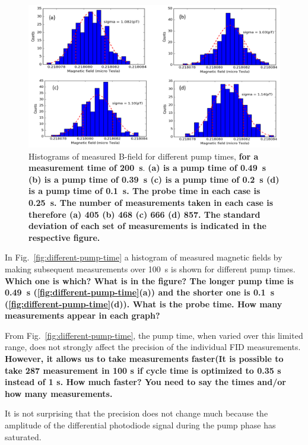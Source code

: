 \begin{figure}%
  \centering\includegraphics[width=\linewidth]{figures/pump_time}
  \caption{Histograms of measured B-field for different pump times,
    {\bf for a measurement time of 200~s}. {\bf (a) is a pump time of
      0.49~s (b) is a pump time of 0.39~s (c) is a pump time of 0.2~s
      (d) is a pump time of 0.1~s.  The probe time in each case is
      0.25~s.  The number of measurements taken in each case is
      therefore (a) 405 (b) 468 (c) 666 (d) 857.  The standard
      deviation of each set of measurements is indicated in the
      respective figure.}\label{fig:differentpump-time}}
\end{figure}

In Fig.~\ref{fig:different-pump-time} a histogram of measured magnetic
fields by making subsequent measurements over 100~s is shown for
different pump times.  {\bf Which one is which? What is in the figure?
  The longer pump time is 0.49~s (\ref{fig:different-pump-time}(a)) and the shorter one is 0.1~s (\ref{fig:different-pump-time}(d)).  What
  is the probe time.  How many measurements appear in each graph?}

From Fig.~\ref{fig:different-pump-time}, the pump time, when varied
over this limited range, does not strongly affect the precision of the
individual FID measurements.  {\bf However, it allows us to take
  measurements faster(It is possible to take 287 measurement in 100 s
  if cycle time is optimized to 0.35 s instead of 1 s.  How much
  faster?  You need to say the times and/or how many measurements.}
  

It is not surprising that the precision does not change much because
the amplitude of the differential photodiode signal during the pump
phase has saturated.




